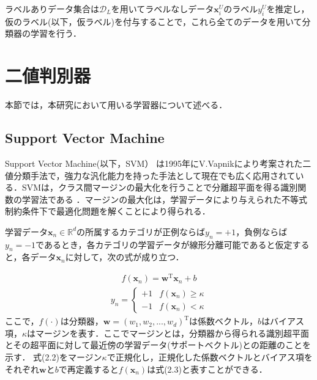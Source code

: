 
ラベルありデータ集合は$\mathcal D_L$を用いてラベルなしデータ$\bm{x}_i^U$のラベル$y_i^U$を推定し，仮のラベル(以下，仮ラベル)を付与することで，これら全てのデータを用いて分類器の学習を行う．

\section{二値判別器}
本節では，本研究において用いる学習器について述べる．
\subsection{Support Vector Machine}
Support Vector Machine(以下，SVM） \cite{VV}は1995年にV.Vapnikにより考案された二値分類手法で，強力な汎化能力を持った手法として現在でも広く応用されている．SVMは，クラス間マージンの最大化を行うことで分離超平面を得る識別関数の学習法である \cite{Bryant99}．マージンの最大化は，学習データにより与えられた不等式制約条件下で最適化問題を解くことにより得られる．

学習データ${\bm x}_{n}\in \mathbb{R}^{d}$の所属するカテゴリが正例ならば$y_{n}=+1$，負例ならば$y_{n}=-1$であるとき，各カテゴリの学習データが線形分離可能であると仮定すると，各データ${\bm x}_{n}$に対して，次の式が成り立つ．

\begin{eqnarray}
f({\bm x}_{n})={\bm w}^{\mathrm{T}}{\bm x}_{n}+b
\end{eqnarray}
\begin{eqnarray}
y_{n}=
\begin{cases}
+1 &f({\bm x}_{n})\ge \kappa \\
-1 & f({\bm x}_{n})< \kappa 
\end{cases}
\end{eqnarray}
ここで，$f(\cdot)$は分類器，${\bm w}=(w_{1},w_{2},...,w_{d})^{\mathrm{T}}$は係数ベクトル，$b$はバイアス項，$\kappa$はマージンを表す．ここでマージンとは，分類器から得られる識別超平面とその超平面に対して最近傍の学習データ(サポートベクトル)との距離のことを示す．
式(2.2)をマージン$\kappa$で正規化し，正規化した係数ベクトルとバイアス項をそれぞれ${\bm w}$と$b$で再定義すると$f({\bm x}_{n})$は式(2.3)と表すことができる．

